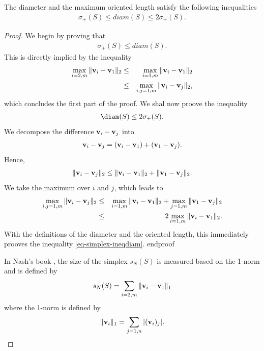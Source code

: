 \begin{proposition}
The diameter and the maximum oriented length
satisfy the following inequalities 
\begin{eqnarray}
\label{simplex-sigma-diam}
\sigma_+(S) \leq diam(S) \leq 2 \sigma_+(S).
\end{eqnarray}
\end{proposition}

\begin{proof}
We begin by proving that
\begin{eqnarray}
\sigma_+(S) \leq diam(S).
\end{eqnarray}
This is directly implied by the inequality
\begin{eqnarray}
\max_{i=2,m} \|\mathbf{v}_i - \mathbf{v}_1\|_2
&\leq& \max_{i=1,m} \|\mathbf{v}_i - \mathbf{v}_1\|_2 \\
&\leq& \max_{i,j=1,m} \|\mathbf{v}_i - \mathbf{v}_j\|_2,
\end{eqnarray}
which concludes the first part of the proof.
We shal now proove the inequality 
\begin{eqnarray}
\label{eq-simplex-ineqdiam}
\diam(S) \leq 2 \sigma_+(S).
\end{eqnarray}
We decompose the difference 
$\mathbf{v}_i - \mathbf{v}_j$ into 
\begin{eqnarray}
\mathbf{v}_i - \mathbf{v}_j = (\mathbf{v}_i - \mathbf{v}_1)+(\mathbf{v}_1 - \mathbf{v}_j).
\end{eqnarray}
Hence,
\begin{eqnarray}
\| \mathbf{v}_i - \mathbf{v}_j\|_2 \leq \|\mathbf{v}_i - \mathbf{v}_1\|_2
+\| \mathbf{v}_1 - \mathbf{v}_j\|_2.
\end{eqnarray}
We take the maximum over $i$ and $j$,
which leads to
\begin{eqnarray}
\max_{i,j=1,m}\| \mathbf{v}_i - \mathbf{v}_j\|_2 
&\leq& \max_{i=1,m}\|\mathbf{v}_i - \mathbf{v}_1\|_2 
+\max_{j=1,m}\| \mathbf{v}_1 - \mathbf{v}_j\|_2 \\
&\leq& 2 \max_{i=1,m}\|\mathbf{v}_i - \mathbf{v}_1\|_2.
\end{eqnarray}
With the definitions of the diameter
and the oriented length, this immediately 
prooves the inequality 
\ref{eq-simplex-ineqdiam}.
end{proof}

In Nash's book \cite{nla.cat-vn1060620}, the size of the simplex $s_N(S)$ is measured
based on the 1-norm and is defined by 
\begin{eqnarray}
\label{simplex-sizenash}
s_N(S) = \sum_{i=2,m} \|\mathbf{v}_i - \mathbf{v}_1\|_1
\end{eqnarray}
where the 1-norm is defined by 
\begin{eqnarray}
\label{simplex-sizenash2}
\|\mathbf{v}_i \|_1 = \sum_{j=1,n} |(\mathbf{v}_i)_j|.
\end{eqnarray}


\end{proof}

